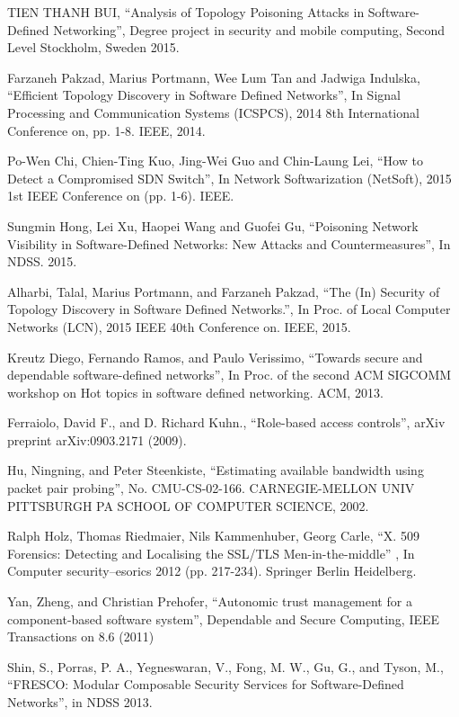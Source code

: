 \begin{thebibliography}{1}
TIEN THANH BUI,
``Analysis of Topology Poisoning Attacks in Software-Defined Networking'', Degree project in security and mobile computing, Second Level Stockholm, Sweden 2015.

Farzaneh Pakzad, Marius Portmann, Wee Lum Tan and Jadwiga Indulska,
``Efficient Topology Discovery in Software Defined Networks'', In Signal Processing and Communication Systems (ICSPCS), 2014 8th International Conference on, pp. 1-8. IEEE, 2014. 

Po-Wen Chi, Chien-Ting Kuo, Jing-Wei Guo and Chin-Laung Lei,
``How to Detect a Compromised SDN Switch'', In Network Softwarization (NetSoft), 2015 1st IEEE Conference on (pp. 1-6). IEEE.

Sungmin Hong, Lei Xu, Haopei Wang and Guofei Gu,
``Poisoning Network Visibility in Software-Defined Networks: New Attacks and Countermeasures'', In NDSS. 2015. 

Alharbi, Talal, Marius Portmann, and Farzaneh Pakzad,
``The (In) Security of Topology Discovery in Software Defined Networks.'', In Proc. of Local Computer Networks (LCN), 2015 IEEE 40th Conference on. IEEE, 2015.

Kreutz Diego, Fernando Ramos, and Paulo Verissimo, 
``Towards secure and dependable software-defined networks'', In Proc. of the second ACM SIGCOMM workshop on Hot topics in software defined networking. ACM, 2013.


Ferraiolo, David F., and D. Richard Kuhn., 
``Role-based access controls'', arXiv preprint arXiv:0903.2171 (2009).

\bibitem{}
Hu, Ningning, and Peter Steenkiste,
``Estimating available bandwidth using packet pair probing'', No. CMU-CS-02-166. CARNEGIE-MELLON UNIV PITTSBURGH PA SCHOOL OF COMPUTER SCIENCE, 2002.

Ralph Holz, Thomas Riedmaier, Nils Kammenhuber, Georg Carle, 
``X. 509 Forensics: Detecting and Localising the SSL/TLS Men-in-the-middle'' , In Computer security–esorics 2012 (pp. 217-234). Springer Berlin Heidelberg.

Yan, Zheng, and Christian Prehofer,
``Autonomic trust management for a component-based software system'', Dependable and Secure Computing, IEEE Transactions on 8.6 (2011)

Shin, S., Porras, P. A., Yegneswaran, V., Fong, M. W., Gu, G., and Tyson, M.,
``FRESCO: Modular Composable Security Services for Software-Defined Networks'', in NDSS 2013.


\end{thebibliography}
